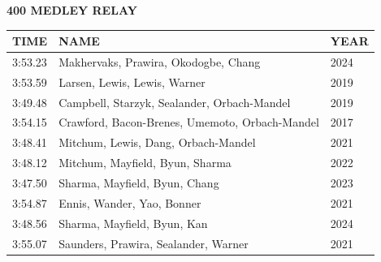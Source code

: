\begin{table}[H]
\centering
\begin{minipage}[t]{0.6\textwidth}
\centering
\textbf{400 MEDLEY RELAY}\\[0.1cm]
\begin{tabular}{@{}p{1.8cm}p{2.8cm}p{1.2cm}@{}}
\hline
    \textbf{TIME} & \textbf{NAME} & \textbf{YEAR} \\
\hline
    3:53.23 & Makhervaks, Prawira, Okodogbe, Chang & 2024 \\
    3:53.59 & Larsen, Lewis, Lewis, Warner & 2019 \\
    3:49.48 & Campbell, Starzyk, Sealander, Orbach-Mandel & 2019 \\
    3:54.15 & Crawford, Bacon-Brenes, Umemoto, Orbach-Mandel & 2017 \\
    3:48.41 & Mitchum, Lewis, Dang, Orbach-Mandel & 2021 \\
    3:48.12 & Mitchum, Mayfield, Byun, Sharma & 2022 \\
    3:47.50 & Sharma, Mayfield, Byun, Chang & 2023 \\
    3:54.87 & Ennis, Wander, Yao, Bonner & 2021 \\
    3:48.56 & Sharma, Mayfield, Byun, Kan & 2024 \\
    3:55.07 & Saunders, Prawira, Sealander, Warner & 2021 \\
\hline
\end{tabular}
\end{minipage}
\end{table}


\newpage



